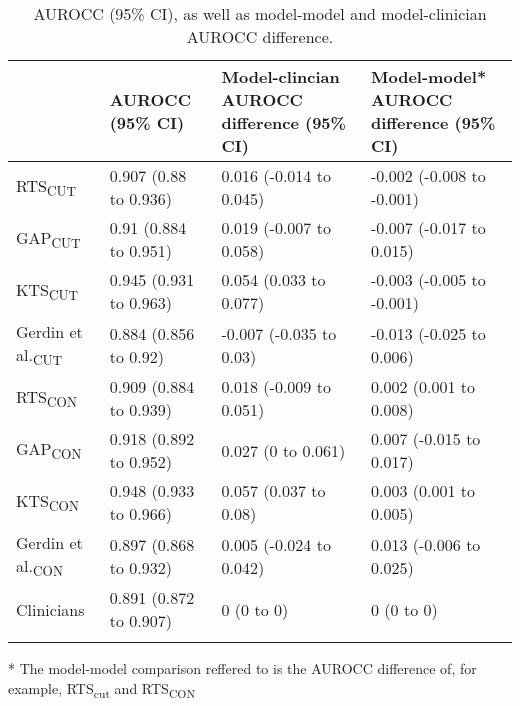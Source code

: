 \begin{table}[!ht]
\centering
\caption{AUROCC (95\% CI), as well as model-model and model-clinician AUROCC difference.} 
\label{table:auc}
\begin{adjustbox}{max width = \linewidth} 
\begin{threeparttable} 
\begin{tabular} 
{llll}
   & AUROCC (95\% CI) & Model-clincian AUROCC difference (95\% CI) & Model-model* AUROCC difference (95\% CI) \\ 
  \midrule
RTS\textsubscript{CUT} & 0.907 (0.88 to 0.936) & 0.016 (-0.014 to 0.045) & -0.002 (-0.008 to -0.001) \\ 
  GAP\textsubscript{CUT} & 0.91 (0.884 to 0.951) & 0.019 (-0.007 to 0.058) & -0.007 (-0.017 to 0.015) \\ 
  KTS\textsubscript{CUT} & 0.945 (0.931 to 0.963) & 0.054 (0.033 to 0.077) & -0.003 (-0.005 to -0.001) \\ 
  Gerdin et al.\textsubscript{CUT} & 0.884 (0.856 to 0.92) & -0.007 (-0.035 to 0.03) & -0.013 (-0.025 to 0.006) \\ 
  RTS\textsubscript{CON} & 0.909 (0.884 to 0.939) & 0.018 (-0.009 to 0.051) & 0.002 (0.001 to 0.008) \\ 
  GAP\textsubscript{CON} & 0.918 (0.892 to 0.952) & 0.027 (0 to 0.061) & 0.007 (-0.015 to 0.017) \\ 
  KTS\textsubscript{CON} & 0.948 (0.933 to 0.966) & 0.057 (0.037 to 0.08) & 0.003 (0.001 to 0.005) \\ 
  Gerdin et al.\textsubscript{CON} & 0.897 (0.868 to 0.932) & 0.005 (-0.024 to 0.042) & 0.013 (-0.006 to 0.025) \\ 
  Clinicians & 0.891 (0.872 to 0.907) & 0 (0 to 0) & 0 (0 to 0) \\ 
   \bottomrule
\addlinespace 
\end{tabular} 
\begin{tablenotes} \footnotesize 
\item[*] The model-model comparison reffered to is the AUROCC difference of, for example, RTS\textsubscript{cut} and RTS\textsubscript{CON} 

\end{tablenotes} 
\end{threeparttable} 
\end{adjustbox}
\end{table}

